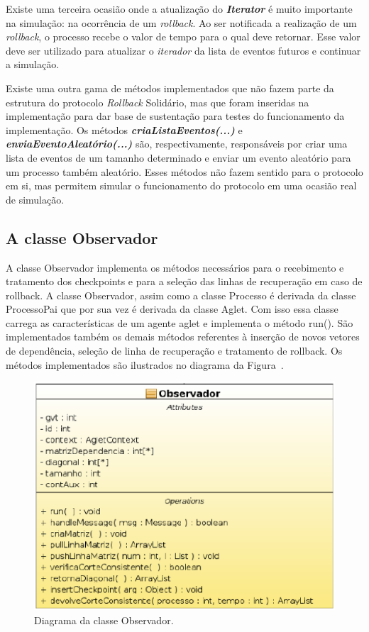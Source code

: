 Existe uma terceira ocasião onde a atualização do \textit{\textbf{Iterator}} é muito importante na simulação: na ocorrência de um \textit{rollback}. Ao ser notificada a realização de um \textit{rollback}, o processo recebe o valor de tempo para o qual deve retornar. Esse valor deve ser utilizado para atualizar o \textit{iterador} da lista de eventos futuros e continuar a simulação.

Existe uma outra gama de métodos implementados que não fazem parte da estrutura do protocolo \textit{Rollback} Solidário, mas que foram inseridas na implementação para dar base de sustentação para testes do funcionamento da implementação. Os métodos \textit{\textbf{criaListaEventos(...)}} e  \textit{\textbf{enviaEventoAleatório(...)}} são, respectivamente, responsáveis por criar uma lista de eventos de um tamanho determinado e enviar um evento aleatório para um processo também aleatório. Esses métodos não fazem sentido para o protocolo em si, mas permitem simular o funcionamento do protocolo em uma ocasião real de simulação.

\subsection{A classe Observador}

	A classe Observador implementa os métodos necessários para o recebimento e tratamento dos checkpoints e para a seleção das linhas de recuperação em caso de rollback. A classe Observador, assim como a classe Processo é derivada da classe ProcessoPai que por sua vez é derivada da classe Aglet. Com isso essa classe carrega as características de um agente aglet e implementa o método run(). São implementados também os demais métodos referentes à inserção de novos vetores de dependência, seleção de linha de recuperação e tratamento de rollback. Os métodos implementados são ilustrados no diagrama da Figura~\cite{fig:classe_observador}.
	

\begin{figure}[htb]
  \centering
  \centerline{\includegraphics[scale=0.6]{imagens/classe_observador.eps}}
  \caption{Diagrama da classe Observador.}
\label{fig:classe_observador}
\end{figure}
	 
